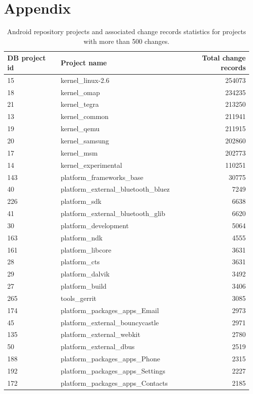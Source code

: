 \documentclass[a4paper,10pt]{article}
\numberwithin{equation}{subsection}
\begin{document}
\section{Appendix}
\begin{table}
  \caption{Android repository projects and associated change records statistics 
     for projects with more than 500 changes.}
  \label{tab:projects}
  \begin{tabularx}{\textwidth}{ | X | l | r |}
  \hline                       
  DB project id & Project name & Total change records \\
  \hline 
15 & kernel\_linux-2.6 & 254073\\ 
18 & kernel\_omap & 234235\\ 
21 & kernel\_tegra & 213250\\ 
13 & kernel\_common & 211941\\ 
19 & kernel\_qemu & 211915\\ 
20 & kernel\_samsung & 202860\\ 
17 & kernel\_msm & 202773\\ 
14 & kernel\_experimental & 110251\\ 
143 & platform\_frameworks\_base & 30775\\ 
40 & platform\_external\_bluetooth\_bluez & 7249\\ 
226 & platform\_sdk & 6638\\ 
41 & platform\_external\_bluetooth\_glib & 6620\\ 
30 & platform\_development & 5064\\ 
163 & platform\_ndk & 4555\\ 
161 & platform\_libcore & 3631\\ 
28 & platform\_cts & 3631\\ 
29 & platform\_dalvik & 3492\\ 
27 & platform\_build & 3406\\ 
265 & tools\_gerrit & 3085\\ 
174 & platform\_packages\_apps\_Email & 2973\\ 
45 & platform\_external\_bouncycastle & 2971\\ 
135 & platform\_external\_webkit & 2780\\ 
50 & platform\_external\_dbus & 2519\\ 
188 & platform\_packages\_apps\_Phone & 2315\\ 
192 & platform\_packages\_apps\_Settings & 2227\\ 
172 & platform\_packages\_apps\_Contacts & 2185\\ 

\end{tabularx}
\end{table}
\end{document}
